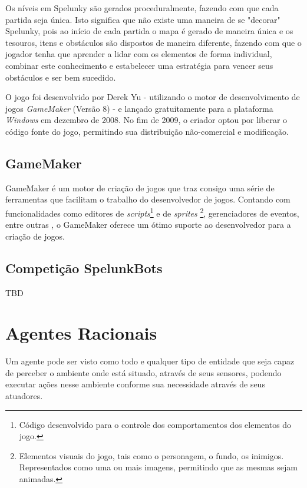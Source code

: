 Os níveis em Spelunky são gerados proceduralmente, fazendo com que cada partida
seja única. Isto significa que não existe uma maneira de se "decorar" Spelunky,
pois ao início de cada partida o mapa é gerado de maneira única e os tesouros,
itens e obstáculos são dispostos de maneira diferente, fazendo com que o jogador
tenha que aprender a lidar com os elementos de forma individual, combinar este
conhecimento e estabelecer uma estratégia para vencer seus obstáculos e ser bem
sucedido.

O jogo foi desenvolvido por Derek Yu - utilizando o motor de desenvolvimento de
jogos \textit{GameMaker} (Versão 8) - e lançado gratuitamente para a plataforma
\textit{Windows} em dezembro de 2008\cite{SPELUNKYRELEASE}. No fim de 2009, o
criador optou por liberar o código fonte do jogo, permitindo sua distribuição
não-comercial e modificação\cite{SPELUNKYLICENSE}.


\subsection{GameMaker}

GameMaker é um motor de criação de jogos que traz consigo uma série de
ferramentas que facilitam o trabalho do desenvolvedor de jogos. Contando com
funcionalidades como editores de \textit{scripts}\footnote{Código desenvolvido
para o controle dos comportamentos dos elementos do jogo.} e de \textit{sprites}
\footnote{Elementos visuais do jogo, tais como o personagem, o fundo, os
inimigos. Representados como uma ou mais imagens, permitindo que as mesmas sejam
animadas.}, gerenciadores de eventos, entre outras \cite{GMAKER8DOCS}, o
GameMaker oferece um ótimo suporte ao desenvolvedor para a criação de jogos.

\subsection{Competição SpelunkBots}

TBD

\section{Agentes Racionais}

Um agente pode ser visto como todo e qualquer tipo de entidade que seja capaz de
perceber o ambiente onde está situado, através de seus sensores, podendo
executar ações nesse ambiente conforme sua necessidade através de seus
atuadores.  \cite{Russell:1995:AIM:193191}

